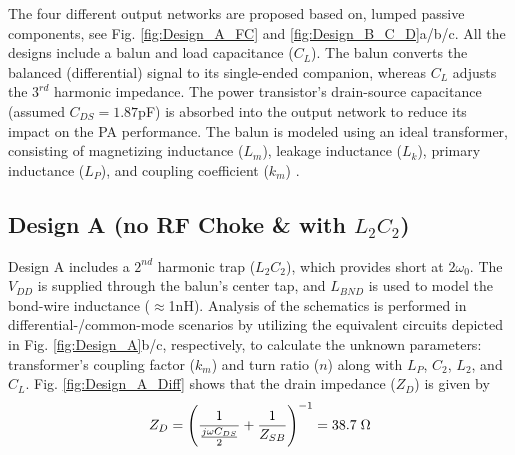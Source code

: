 \documentclass[conference]{IEEEtran}
\begin{document}
The four different  output networks are proposed based on, lumped passive components, see Fig. \ref{fig:Design_A_FC} and \ref{fig:Design_B_C_D}a/b/c. All the designs include a balun and load capacitance ($C_L$). The balun converts the balanced (differential) signal to its single-ended companion, whereas $C_L$ adjusts the $3^{rd}$ harmonic impedance. The power transistor's drain-source capacitance (assumed $C_{DS}=1.87$pF) is absorbed into the output network to reduce its impact on the PA performance. The balun is modeled using an ideal transformer, consisting of magnetizing inductance ($L_m$), leakage inductance ($L_k$), primary inductance ($L_P$), and coupling coefficient ($k_m$) \cite{Transformer_model}. 

\subsection{Design A (no RF Choke \& with $L_2C_2$)}
Design A includes a $2^{nd}$ harmonic trap ($L_2C_2$), which provides short at $2\omega_0$. The $V_{DD}$ is supplied through the balun's center tap, and $L_{BND}$ is used to model the bond-wire inductance ($\approx$1nH). Analysis of the schematics is performed in differential-/common-mode scenarios by utilizing the equivalent circuits depicted in Fig. \ref{fig:Design_A}b/c, respectively, to calculate the unknown parameters: transformer's coupling factor ($k_m$) and turn ratio ($n$) along with  $L_P$, $C_2$, $L_2$, and $C_L$. Fig. \ref{fig:Design_A_Diff} shows that the drain impedance ($Z_D$) is given by
\vspace{-0.05in}
\begin{equation}
	Z_D=\left(\frac{1}{\frac{j\omega C_{DS}}{2}}+\frac{1}{Z_{SB}}\right)^{-1}=38.7 \hspace{1mm} \Omega
	\label{eqn:ZD}
\end{equation}
\end{document}
